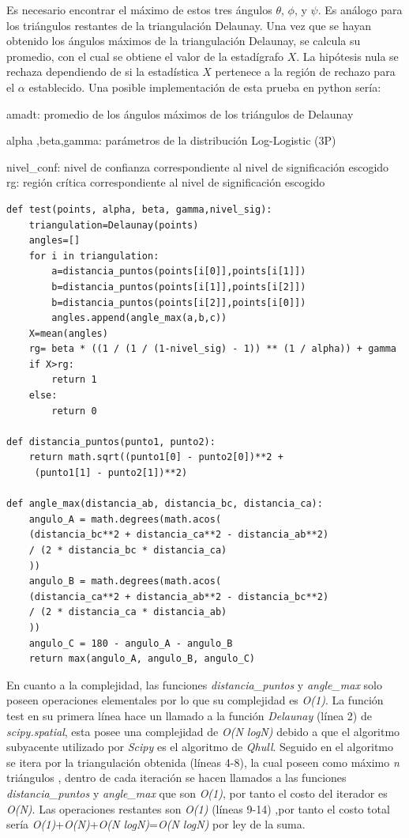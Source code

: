 \documentclass[12pt]{report}
\begin{document}
Es necesario encontrar el máximo de estos tres ángulos \(\theta\), \(\phi\), y \(\psi\). Es análogo para los triángulos restantes de la triangulación Delaunay. Una vez que se hayan obtenido los ángulos máximos de la triangulación Delaunay, se calcula su promedio, con el cual se obtiene el valor de la estadígrafo \(X\). La hipótesis nula se rechaza dependiendo de si la estadística \(X\) pertenece a la región de rechazo para el \(\alpha\) establecido. Una posible implementación de esta prueba en python sería:

amadt: promedio de los ángulos máximos de los triángulos de Delaunay

alpha ,beta,gamma: parámetros de la distribución Log-Logistic (3P)

nivel\_conf: nivel de confianza correspondiente al nivel de significación escogido
rg: región crítica correspondiente al nivel de significación escogido


\begin{lstlisting}
def test(points, alpha, beta, gamma,nivel_sig):
	triangulation=Delaunay(points)
	angles=[]
	for i in triangulation:
		a=distancia_puntos(points[i[0]],points[i[1]])
		b=distancia_puntos(points[i[1]],points[i[2]])
		b=distancia_puntos(points[i[2]],points[i[0]])
		angles.append(angle_max(a,b,c))     
	X=mean(angles) 
	rg= beta * ((1 / (1 / (1-nivel_sig) - 1)) ** (1 / alpha)) + gamma
	if X>rg:
		return 1
	else:
		return 0

def distancia_puntos(punto1, punto2):
	return math.sqrt((punto1[0] - punto2[0])**2 +
	 (punto1[1] - punto2[1])**2)

def angle_max(distancia_ab, distancia_bc, distancia_ca):
	angulo_A = math.degrees(math.acos(
	(distancia_bc**2 + distancia_ca**2 - distancia_ab**2) 
	/ (2 * distancia_bc * distancia_ca)
	))
	angulo_B = math.degrees(math.acos(
	(distancia_ca**2 + distancia_ab**2 - distancia_bc**2) 
	/ (2 * distancia_ca * distancia_ab)
	))
	angulo_C = 180 - angulo_A - angulo_B  
	return max(angulo_A, angulo_B, angulo_C)
\end{lstlisting}

En cuanto a la complejidad, las funciones \textit{distancia\_puntos} y \textit{angle\_max} solo poseen operaciones elementales por lo que su complejidad es \textit{O(1)}. La función test en su primera línea hace un llamado a la función  \textit{Delaunay} (línea 2) de \textit{scipy.spatial}, esta posee una complejidad de \textit{O(N logN)} debido a que el algoritmo subyacente utilizado por \textit{Scipy} es el algoritmo de \textit{Qhull}. Seguido en el algoritmo se itera por la triangulación obtenida (líneas 4-8), la cual poseen como máximo \textit{n} triángulos , dentro de cada iteración se hacen llamados a las  funciones \textit{distancia\_puntos} y \textit{angle\_max}  que son \textit{O(1)}, por tanto el costo del iterador es \textit{O(N)}. Las operaciones restantes son \textit{O(1)} (líneas 9-14) ,por tanto el costo total sería \textit{O(1)}+\textit{O(N)}+\textit{O(N logN)}=\textit{O(N logN)} por ley de la suma.
\end{document}
